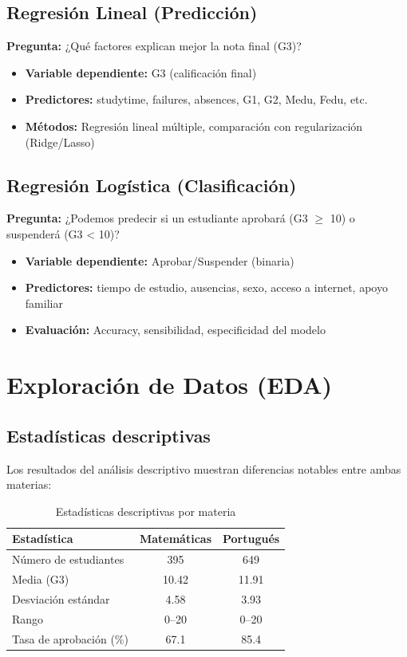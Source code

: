 \documentclass[a4paper,12pt]{article}
\begin{document}
\subsection{Regresión Lineal (Predicción)}
\textbf{Pregunta:} ¿Qué factores explican mejor la nota final (G3)?

\begin{itemize}
    \item \textbf{Variable dependiente:} G3 (calificación final)
    \item \textbf{Predictores:} studytime, failures, absences, G1, G2, Medu, Fedu, etc.
    \item \textbf{Métodos:} Regresión lineal múltiple, comparación con regularización (Ridge/Lasso)
\end{itemize}

\subsection{Regresión Logística (Clasificación)}
\textbf{Pregunta:} ¿Podemos predecir si un estudiante aprobará (G3 $\ge$ 10) o suspenderá (G3 < 10)?
 
\begin{itemize}
    \item \textbf{Variable dependiente:} Aprobar/Suspender (binaria)
    \item \textbf{Predictores:} tiempo de estudio, ausencias, sexo, acceso a internet, apoyo familiar
    \item \textbf{Evaluación:} Accuracy, sensibilidad, especificidad del modelo
\end{itemize}

\section{Exploración de Datos (EDA)}

\subsection{Estadísticas descriptivas}

Los resultados del análisis descriptivo muestran diferencias notables entre ambas materias:

\begin{table}[H]
\centering
\begin{tabular}{lcc}
\toprule
\textbf{Estadística} & \textbf{Matemáticas} & \textbf{Portugués} \\
\midrule
Número de estudiantes & 395 & 649 \\
Media (G3) & 10.42 & 11.91 \\
Desviación estándar & 4.58 & 3.93 \\
Rango & 0--20 & 0--20 \\
Tasa de aprobación (\%) & 67.1 & 85.4 \\
\bottomrule
\end{tabular}
\caption{Estadísticas descriptivas por materia}
\label{tab:descriptivas}
\end{table}
\end{document}

